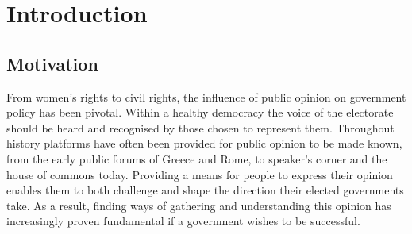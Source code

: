 
\chapter{Introduction}


\section{Motivation}

From women's rights to civil rights, the influence of public opinion on government policy has been pivotal. Within a healthy democracy the voice of the electorate should be heard and recognised by those chosen to represent them. Throughout history platforms have often been provided for public opinion to be made known, from the early public forums of Greece and Rome, to speaker's corner and the house of commons today. Providing a means for people to express their opinion enables them to both challenge and shape the direction their elected governments take. As a result, finding ways of gathering and understanding this opinion has increasingly proven fundamental if a government wishes to be successful.

